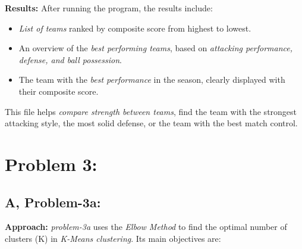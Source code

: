\documentclass[12pt]{article}
\begin{document}
\textbf{Results:} After running the program, the results include:

\begin{itemize}
    \item \textit{List of teams} ranked by composite score from highest to lowest.
    \item An overview of the \textit{best performing teams}, based on \textit{attacking performance, defense, and ball possession}.
    \item The team with the \textit{best performance} in the season, clearly displayed with their composite score.
\end{itemize}

This file helps \textit{compare strength between teams}, find the team with the strongest attacking style, the most solid defense, or the team with the best match control.

\section{Problem 3:}

\subsection*{A, Problem-3a:}

\textbf{Approach:} \textit{problem-3a} uses the \textit{Elbow Method} to find the optimal number of clusters (K) in \textit{K-Means clustering}. Its main objectives are:
\end{document}
